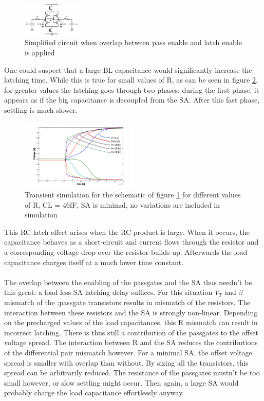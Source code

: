 \documentclass[journal]{IEEEtran}
\begin{document}
\begin{figure}[ht!]
  \centering
  \includegraphics[width=0.25\textwidth]{../fig/hfdstk-sensamp-RC-latch.png}
  \caption{Simplified circuit when overlap between pass enable and latch enable is applied}
  \label{fig:RC-latch}
\end{figure}

One could suspect that a large BL capacitance would significantly increase the latching time. While this is true for small values of R, as can be seen in figure \ref{fig:RC-latch-sim}, for greater values the latching goes through two phases: during the first phase, it appears as if the big capacitance is decoupled from the SA. After this fast phase, settling is much slower. 

\begin{figure}[ht!]
  \centering
  \includegraphics[width=0.5\textwidth]{../fig/hfdstk-sensamp-RC-latch-sim.png}
  \caption{Transient simulation for the schematic of figure \ref{fig:RC-latch} for different values of R, CL = 46fF, SA is minimal, no variations are included in simulation}
  \label{fig:RC-latch-sim}
\end{figure}

This RC-latch effect arises when the RC-product is large. When it occurs, the capacitance behaves as a short-circuit and current flows through the resistor and a corresponding voltage drop over the resistor builds up. Afterwards the load capacitance charges itself at a much lower time constant.

\paragraph{}
The overlap between the enabling of the passgates and the SA thus needn't be this great: a load-less SA latching delay suffices. For this situation $V_{T}$ and $\beta$ mismatch of the ;passgate transistors results in mismatch of the resistors. The interaction between these resistors and the SA is strongly non-linear. Depending on the precharged values of the load capacitances, this R mismatch can result in incorrect latching. There is thus still a contribution of the passgates to the offset voltage spread. The interaction between R and the SA reduces the contributions of the differential pair mismatch however. For a minimal SA, the offset voltage spread is smaller with overlap than without. By sizing all the transistors, this spread can be arbitrarily reduced. The resistance of the passgates mustn't be too small however, or slow settling might occur. Then again, a large SA would probably charge the load capacitance effortlessly anyway.
\end{document}
